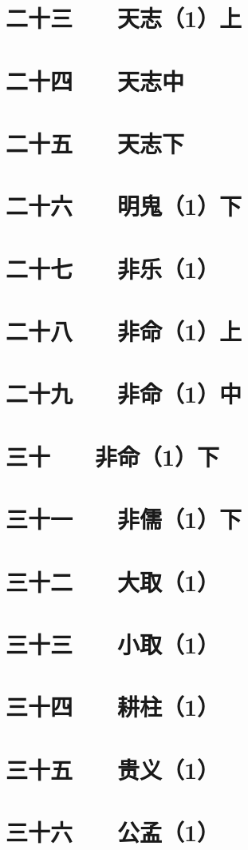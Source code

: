 \documentclass[12pt,UTF8]{ctexbook}
\begin{document}
\chapter{二十三　　天志（1）上}
\chapter{二十四　　天志中}
\chapter{二十五　　天志下}
\chapter{二十六　　明鬼（1）下}
\chapter{二十七　　非乐（1）}
\chapter{二十八　　非命（1）上}
\chapter{二十九　　非命（1）中}
\chapter{三十　　非命（1）下}
\chapter{三十一　　非儒（1）下}
\chapter{三十二　　大取（1）}
\chapter{三十三　　小取（1）}
\chapter{三十四　　耕柱（1）}
\chapter{三十五　　贵义（1）}
\chapter{三十六　　公孟（1）}
\end{document}
